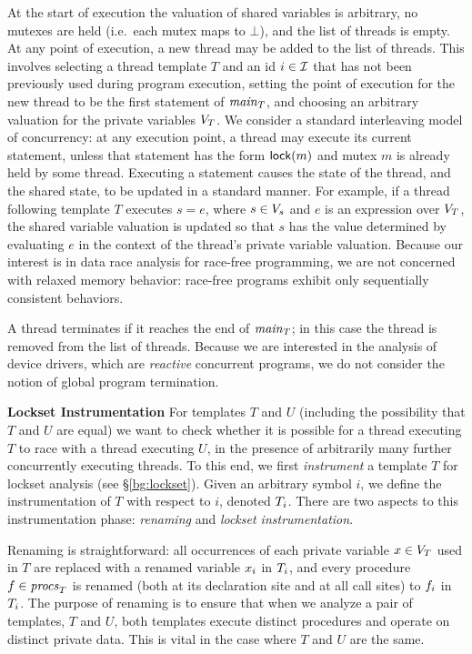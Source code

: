 At the start of execution the valuation of shared variables is arbitrary, no mutexes are held (i.e.\ each mutex maps to $\bot$), and the list of threads is empty.
%
At any point of execution, a new thread may be added to the list of threads.  This involves selecting a thread template $T$ and an id $i \in \mathcal{I}$ that has not been previously used during program execution, setting the point of execution for the new thread to be the first statement of $\mathit{main}_{T}$, and choosing an arbitrary valuation for the private variables $V_{T}$.
%
We consider a standard interleaving model of concurrency: at any execution point, a thread may execute its current statement, unless that statement has the form $\mathsf{lock}(m)$ and mutex $m$ is already held by some thread.  Executing a statement causes the state of the thread, and the shared state, to be updated in a standard manner.  For example, if a thread following template $T$ executes $s = e$, where $s \in V_s$ and $e$ is an expression over $V_{T}$, the shared variable valuation is updated so that $s$ has the value determined by evaluating $e$ in the context of the thread's private variable valuation.  Because our interest is in data race analysis for race-free programming, we are not concerned with relaxed memory behavior: race-free programs exhibit only sequentially consistent behaviors.

A thread terminates if it reaches the end of $\mathit{main}_{T}$; in this case the thread is removed from the list of threads.  Because we are interested in the analysis of device drivers, which are \emph{reactive} concurrent programs, we do not consider the notion of global program termination.

\noindent\textbf{Lockset Instrumentation }
%
For templates $T$ and $U$ (including the possibility that $T$ and $U$ are equal) we want to check whether it is possible for a thread executing $T$ to race with a thread executing $U$, in the presence of arbitrarily many further concurrently executing threads.
%
To this end, we first \emph{instrument} a template $T$ for lockset analysis (see \S\ref{bg:lockset}).  Given an arbitrary symbol $i$, we define the instrumentation of $T$ with respect to $i$, denoted $T_{i}$.  There are two aspects to this instrumentation phase: \emph{renaming} and \emph{lockset instrumentation}.

Renaming is straightforward: all occurrences of each private variable $x \in V_{T}$ used in $T$ are replaced with a renamed variable $x_{i}$ in $T_{i}$, and every procedure $f \in \mathit{procs}_{T}$ is renamed (both at its declaration site and at all call sites) to $f_{i}$ in $T_{i}$.  The purpose of renaming is to ensure that when we analyze a pair of templates, $T$ and $U$, both templates execute distinct procedures and operate on distinct private data.  This is vital in the case where $T$ and $U$ are the same.

